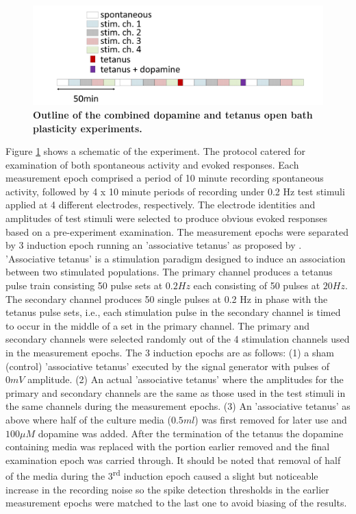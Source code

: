         \label{sec:activity:plasticityProtocol}
        \begin{figure}[!htb]
            \centering
            \includegraphics[width=15cm]{chapter3/figures/ExpOutline/expOutlineTet.jpg}

            \caption[Outline of the combined dopamine-and-tetanus-induced open bath plasticity experiments]{\textbf{Outline of the combined dopamine and tetanus open bath plasticity experiments.}}
            \label{fig:activity:expOutline}
        \end{figure}

    Figure \ref{fig:activity:expOutline} shows a schematic of the experiment. The protocol catered for examination of both spontaneous activity and evoked responses. Each measurement epoch comprised a period of 10 minute recording spontaneous activity, followed by 4 x 10 minute periods of recording under 0.2 Hz test stimuli applied at 4 different electrodes, respectively. The electrode identities and amplitudes of test stimuli were selected to produce obvious evoked responses based on a pre-experiment examination. The measurement epochs were separated by 3 induction epoch running an 'associative tetanus' as proposed by \cite{chiappalone2008network}. 'Associative tetanus' is a stimulation paradigm designed to induce an association between two stimulated populations. The primary channel produces a tetanus pulse train consisting 50 pulse sets at \(0.2 Hz\) each consisting of 50 pulses at \(20 Hz\). The secondary channel produces 50 single pulses at 0.2 Hz in phase with the tetanus pulse sets, i.e., each stimulation pulse in the secondary channel is timed to occur in the middle of a set in the primary channel. The primary and secondary channels were selected randomly out of the 4 stimulation channels used in the measurement epochs. The 3 induction epochs are as follows: (1) a sham (control) 'associative tetanus' executed by the signal generator with pulses of \(0 mV\) amplitude. (2) An actual 'associative tetanus' where the amplitudes for the primary and secondary channels are the same as those used in the test stimuli in the same channels during the measurement epochs. (3) An 'associative tetanus' as above where half of the culture media (\(0.5 ml\)) was first removed for later use and \(100 \mu M\) dopamine was added. After the termination of the tetanus the dopamine containing media was replaced with the portion earlier removed and the final examination epoch was carried through. It should be noted that removal of half of the media during the 3\textsuperscript{rd} induction epoch caused a slight but noticeable increase in the recording noise so the spike detection thresholds in the earlier measurement epochs were matched to the last one to avoid biasing of the results.

